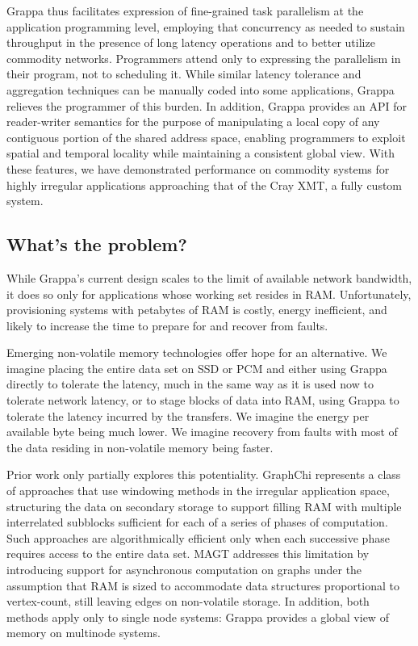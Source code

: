 Grappa thus facilitates
expression of fine-grained task parallelism at the application
programming level, employing that concurrency as needed to sustain throughput in the presence of long latency operations and to better utilize commodity networks.  Programmers attend only to expressing the parallelism in their program, not to scheduling it.  While similar latency
tolerance and aggregation techniques can be manually coded into some
applications, Grappa relieves the programmer of this burden.  In
addition, Grappa provides an API for reader-writer semantics for the
purpose of manipulating a local copy of any contiguous portion of the
shared address space, enabling programmers to exploit spatial and
temporal locality while maintaining a consistent global view.  With
these features, we have demonstrated performance on commodity systems
for highly irregular applications approaching that of the Cray XMT, a
fully custom system.

\subsection{What's the problem?}

While Grappa’s current design scales to the limit of available network
bandwidth, it does so only for applications whose working set resides
in RAM.  Unfortunately, provisioning systems with petabytes of RAM is
costly, energy inefficient, and likely to increase the time to prepare
for and recover from faults.

Emerging non-volatile memory technologies offer hope for an
alternative.  We imagine placing the entire data set on SSD or PCM and
either using Grappa directly to tolerate the latency, much in the same
way as it is used now to tolerate network latency, or to stage blocks
of data into RAM, using Grappa to tolerate the latency incurred by the
transfers.  We imagine the energy per available byte being much lower.
We imagine recovery from faults with most of the data residing in
non-volatile memory being faster.

Prior work only partially explores this potentiality. GraphChi
represents a class of approaches that use windowing methods in the
irregular application space, structuring the data on secondary storage
to support filling RAM with multiple interrelated subblocks sufficient
for each of a series of phases of computation.  Such approaches are
algorithmically efficient only when each successive phase requires
access to the entire data set.  MAGT addresses this limitation by
introducing support for asynchronous computation on graphs under the
assumption that RAM is sized to accommodate data structures
proportional to vertex-count, still leaving edges on non-volatile
storage.  In addition, both methods apply only to single node systems:
Grappa provides a global view of memory on multinode systems.

